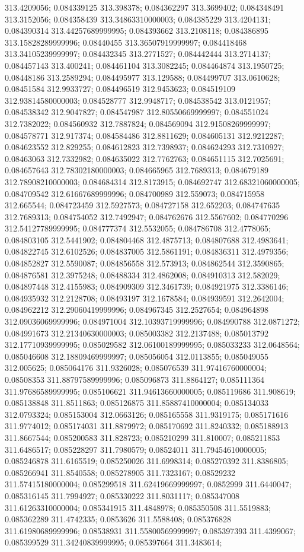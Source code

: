 313.4209056; 0.084339125 313.398378; 0.084362297 313.3699402; 0.084348491 313.3152056; 0.084358439 313.34863310000003; 0.084385229 313.4204131; 0.084390314 313.44257689999995; 0.084393662 313.2108118; 0.084386895 313.15828289999996; 0.08440455 313.36507919999997; 0.084418468 313.34105239999997; 0.084432345 313.2771527; 0.084442444 313.2714137; 0.084457143 313.400241; 0.084461104 313.3082245; 0.084464874 313.1950725; 0.08448186 313.2589294; 0.084495977 313.129588; 0.084499707 313.0610628; 0.08451584 312.9933727; 0.084496519 312.9453623; 0.084519109 312.93814580000003; 0.084528777 312.9948717; 0.084538542 313.0121957; 0.084538342 312.9047827; 0.084547987 312.80550669999997; 0.084551024 312.7382022; 0.084560932 312.7887824; 0.084569094 312.91508269999997; 0.084578771 312.917374; 0.084584486 312.8811629; 0.084605131 312.9212287; 0.084623552 312.829255; 0.084612823 312.7398937; 0.084624293 312.7310927; 0.08463063 312.7332982; 0.084635022 312.7762763; 0.084651115 312.7025691; 0.084657643 312.78302180000003; 0.084665965 312.7689313; 0.084679189 312.78908210000003; 0.084684314 312.8173915; 0.084692747 312.68321060000005; 0.084709542 312.61667689999996; 0.084700989 312.559073; 0.084715958 312.665544; 0.084723459 312.5927573; 0.084727158 312.652203; 0.084747635 312.7689313; 0.084754052 312.7492947; 0.084762676 312.5567602; 0.084770296 312.54127789999995; 0.084777374 312.5532055; 0.084786708 312.4778065; 0.084803105 312.5441902; 0.084804468 312.4875713; 0.084807688 312.4983641; 0.084822745 312.6102526; 0.084837005 312.5861191; 0.084836311 312.4979356; 0.084852827 312.5590087; 0.084856558 312.573913; 0.084862544 312.3590865; 0.084876581 312.3975248; 0.08488334 312.4862008; 0.084910313 312.582029; 0.084897448 312.4155983; 0.084909309 312.3461739; 0.084921975 312.3386146; 0.084935932 312.2128708; 0.08493197 312.1678584; 0.084939591 312.2642004; 0.084962212 312.29060419999996; 0.084967345 312.2527654; 0.084964898 312.09036069999996; 0.084971004 312.10393719999996; 0.084990788 312.0871272; 0.084991673 312.21340630000003; 0.085003382 312.2137488; 0.085013792 312.17710939999995; 0.085029582 312.06100189999995; 0.085033233 312.0648564; 0.085046608 312.18809469999997; 0.085056054 312.0113855; 0.085049055 312.005625; 0.085064176 311.9326028; 0.085076539 311.97416760000004; 0.08508353 311.88797589999996; 0.085096873 311.8864127; 0.085111364 311.97686589999995; 0.085106621 311.94613660000005; 0.085119686 311.908619; 0.085138848 311.8511863; 0.085126875 311.85887410000004; 0.085134033 312.0793324; 0.085153004 312.0663126; 0.085165558 311.9319175; 0.085171616 311.9774012; 0.085174031 311.8879972; 0.085170692 311.8240332; 0.085188913 311.8667544; 0.085200583 311.828723; 0.085210299 311.810007; 0.085211853 311.6486517; 0.085228297 311.7980579; 0.08524011 311.79454610000005; 0.085246878 311.6165519; 0.085250026 311.6998314; 0.085270392 311.8386805; 0.085266941 311.8540558; 0.085278905 311.7323167; 0.08529232 311.57415180000004; 0.085299518 311.62419669999997; 0.0852999 311.6440047; 0.085316145 311.7994927; 0.085330222 311.8031117; 0.085347008 311.61263310000004; 0.085341915 311.4848978; 0.085350508 311.5519883; 0.085362289 311.4742335; 0.0853626 311.5588408; 0.085376828 311.61980689999996; 0.08538931 311.55800569999997; 0.085397393 311.4399067; 0.085399529 311.34240839999995; 0.085397664 311.3483614; 